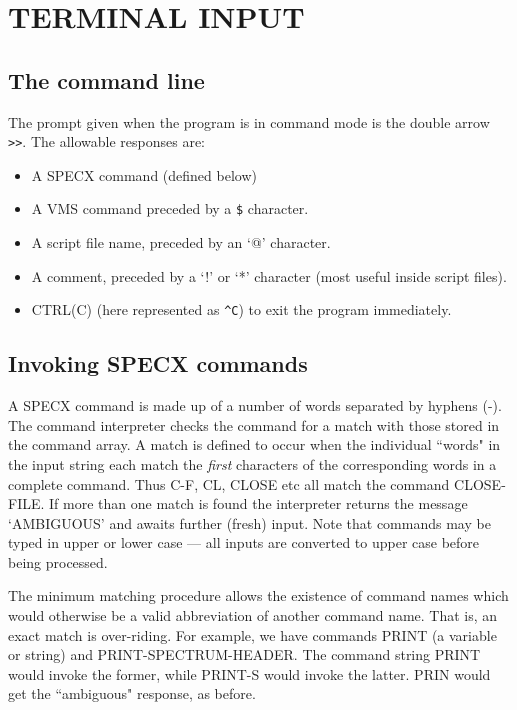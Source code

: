 \documentclass[11pt,twoside]{report}
\begin{document}
\section{TERMINAL INPUT}

\subsection{The command line}
The prompt given when the program is in command mode is the double arrow
\verb+>>+. 
The allowable responses are:
\begin{itemize}
\item
A SPECX command (defined below)
\item
A VMS command preceded by a \verb+$+ character.
\item
A script file name, preceded by an `@' character.
\item
A comment, preceded by a `!' or `*' character (most
useful inside script files).
\item
CTRL(C) (here represented as \verb+^C+) to exit the
program immediately.
\end{itemize}

\subsection{Invoking SPECX commands}

A SPECX command is made up of a number of words
separated by hyphens (-). The command interpreter checks the command for a match with those stored in the
command array. A match is defined to occur when the individual
``words" in the input string each match the {\em first} characters of
the corresponding words in a complete command. Thus C-F, CL, CLOSE etc
all match the command CLOSE-FILE. If more than one match is found the
interpreter returns the message `AMBIGUOUS'
and awaits further (fresh) input. Note that commands may be typed in
upper or lower case --- all
inputs are converted to upper case before being processed.

The minimum matching procedure allows the
existence of command names which would otherwise be a valid
abbreviation of another command name.  That is, an exact match is
over-riding. For example, we have commands PRINT (a variable or
string) and PRINT-SPECTRUM-HEADER. The command string PRINT would
invoke the former, while PRINT-S would invoke the latter. PRIN would
get the ``ambiguous" response, as before.
\end{document}
